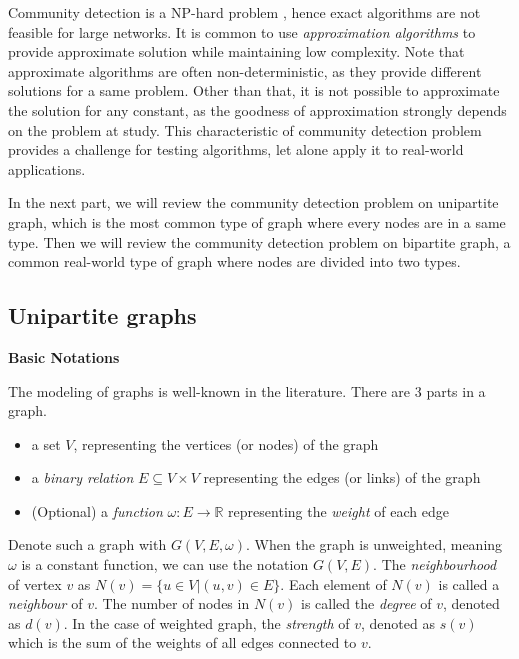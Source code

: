 Community detection is a NP-hard problem \cite{fortunato2010},
hence exact algorithms are not feasible for large networks.
It is common to use \textit{approximation algorithms} to provide approximate solution while maintaining low complexity.
Note that approximate algorithms are often non-deterministic, as they provide different solutions for a same problem.
Other than that, it is not possible to approximate the solution for any constant,
as the goodness of approximation strongly depends on the problem at study.
This characteristic of community detection problem provides a challenge for
testing algorithms, let alone apply it to real-world applications.

In the next part, we will review the community detection problem on unipartite graph,
which is the most common type of graph where every nodes are in a same type.
Then we will review the community detection problem on bipartite graph,
a common real-world type of graph where nodes are divided into two types.

\subsection{Unipartite graphs}

\textbf{Basic Notations}

The modeling of graphs is well-known in the literature.
There are 3 parts in a graph.

\begin{itemize}
	\item a set $V$, representing the vertices (or nodes) of the graph
	\item a \textit{binary relation} $E\subseteq V \times V$ representing the edges (or links) of the graph
	\item (Optional) a \textit{function} $\omega: E \rightarrow \mathbb{R}$ representing the \textit{weight} of each edge
\end{itemize}

Denote such a graph with $G(V, E, \omega)$.
When the graph is unweighted, meaning $\omega$ is a constant function, we can use the notation $G(V, E)$.
The \textit{neighbourhood} of vertex $v$ as $N(v) = \{u \in V | (u, v) \in E\}$.
Each element of $N(v)$ is called a \textit{neighbour} of $v$.
The number of nodes in $N(v)$ is called the \textit{degree} of $v$, denoted as $d(v)$.
In the case of weighted graph, the \textit{strength} of $v$, denoted as $s(v)$
which is the sum of the weights of all edges connected to $v$.

